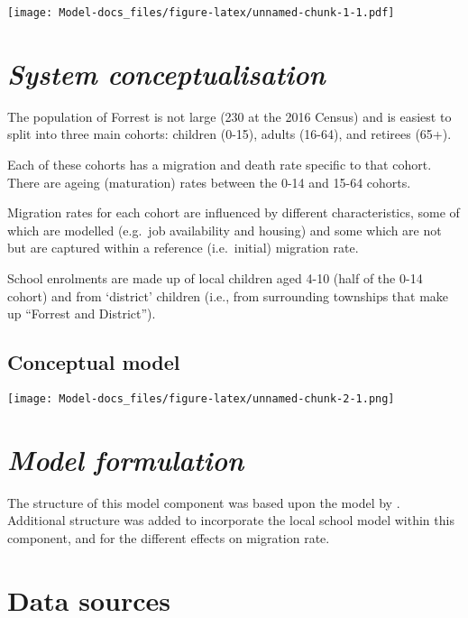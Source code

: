 \documentclass[
  11pt,
]{book}
\begin{document}
\texttt{[image: Model-docs\_files/figure-latex/unnamed-chunk-1-1.pdf]}

\hypertarget{system-conceptualisation}{%
\section{\texorpdfstring{\emph{System conceptualisation}}{System conceptualisation}}\label{system-conceptualisation}}

The population of Forrest is not large (230 at the 2016 Census) and is easiest to split into three main cohorts: children (0-15), adults (16-64), and retirees (65+).

Each of these cohorts has a migration and death rate specific to that cohort. There are ageing (maturation) rates between the 0-14 and 15-64 cohorts.

Migration rates for each cohort are influenced by different characteristics, some of which are modelled (e.g.~job availability and housing) and some which are not but are captured within a reference (i.e.~initial) migration rate.

School enrolments are made up of local children aged 4-10 (half of the 0-14 cohort) and from `district' children (i.e., from surrounding townships that make up ``Forrest and District'').

\hypertarget{conceptual-model}{%
\subsection{Conceptual model}\label{conceptual-model}}

\texttt{[image: Model-docs\_files/figure-latex/unnamed-chunk-2-1.png]}

\hypertarget{model-formulation}{%
\section{\texorpdfstring{\emph{Model formulation}}{Model formulation}}\label{model-formulation}}

The structure of this model component was based upon the model by \citet{navarro_rusem_2019}. Additional structure was added to incorporate the local school model within this component, and for the different effects on migration rate.

\hypertarget{data-sources}{%
\section{Data sources}\label{data-sources}}
\end{document}
